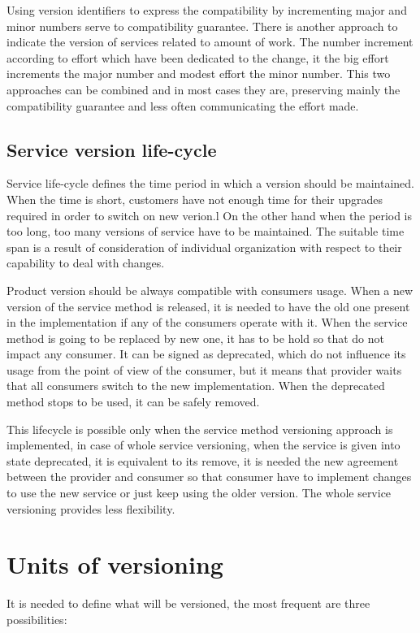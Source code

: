 Using version identifiers to express the compatibility by incrementing major and minor numbers serve to compatibility guarantee. There is another approach to indicate the version of services related to amount of work. The number increment according to effort which have been dedicated to the change, it the big effort increments the major number and modest effort the minor number. This two approaches can be combined and in most cases they are, preserving mainly the compatibility guarantee and less often communicating the effort made. \cite{soa-governance}


\subsection{Service version life-cycle}
Service life-cycle defines the time period in which a version should be maintained. When the time is short, customers have not enough time for their upgrades required in order to switch on new verion.l On the other hand when the period is too long, too many versions of service have to be maintained. The suitable time span is a result of consideration of individual organization with respect to their capability to deal with changes.

Product version should be always compatible with consumers usage. When a new version of the service method is released, it is needed to have the old one present in the implementation if any of the consumers operate with it. When the service method is going to be replaced by new one, it has to be hold so that do not impact any consumer. It can be signed as deprecated, which do not influence its usage from the point of view of the consumer, but it means that provider waits that all consumers switch to the new implementation. When the deprecated method stops to be used, it can be safely removed. 

This lifecycle is possible only when the service method versioning approach is implemented, in case of whole service versioning, when the service is given into state deprecated, it is equivalent to its remove, it is needed the new agreement between the provider and consumer so that consumer have to implement changes to use the new service or just  keep using the older version. The whole service versioning provides less flexibility.

\section{Units of versioning}
It is needed to define what will be versioned, the most frequent are three possibilities:

